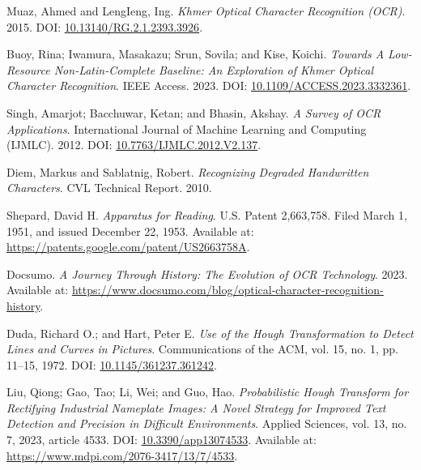 \label{ch:references}

\begin{thebibliography}{99}

Muaz, Ahmed and LengIeng, Ing. 
\textit{Khmer Optical Character Recognition (OCR)}. 
2015. 
DOI: \href{https://doi.org/10.13140/RG.2.1.2393.3926}{10.13140/RG.2.1.2393.3926}.

Buoy, Rina; Iwamura, Masakazu; Srun, Sovila; and Kise, Koichi.
\textit{Towards A Low-Resource Non-Latin-Complete Baseline: An Exploration of Khmer Optical Character Recognition}.
IEEE Access.
2023.
DOI: \href{https://doi.org/10.1109/ACCESS.2023.3332361}{10.1109/ACCESS.2023.3332361}.

Singh, Amarjot; Bacchuwar, Ketan; and Bhasin, Akshay.
\textit{A Survey of OCR Applications}.
International Journal of Machine Learning and Computing (IJMLC).
2012.
DOI: \href{https://doi.org/10.7763/IJMLC.2012.V2.137}{10.7763/IJMLC.2012.V2.137}.

Diem, Markus and Sablatnig, Robert.
\textit{Recognizing Degraded Handwritten Characters}.
CVL Technical Report.
2010.

Shepard, David H.
\textit{Apparatus for Reading}.
U.S. Patent 2,663,758. Filed March 1, 1951, and issued December 22, 1953.
Available at: \href{https://patents.google.com/patent/US2663758A}{https://patents.google.com/patent/US2663758A}.

Docsumo.
\textit{A Journey Through History: The Evolution of OCR Technology}.
2023.
Available at: \href{https://www.docsumo.com/blog/optical-character-recognition-history}{https://www.docsumo.com/blog/optical-character-recognition-history}.

Duda, Richard O.; and Hart, Peter E.
\textit{Use of the Hough Transformation to Detect Lines and Curves in Pictures}.
Communications of the ACM, vol. 15, no. 1, pp. 11–15, 1972.
DOI: \href{https://doi.org/10.1145/361237.361242}{10.1145/361237.361242}.

Liu, Qiong; Gao, Tao; Li, Wei; and Guo, Hao.
\textit{Probabilistic Hough Transform for Rectifying Industrial Nameplate Images: A Novel Strategy for Improved Text Detection and Precision in Difficult Environments}.
Applied Sciences, vol. 13, no. 7, 2023, article 4533.
DOI: \href{https://doi.org/10.3390/app13074533}{10.3390/app13074533}.
Available at: \href{https://www.mdpi.com/2076-3417/13/7/4533}{https://www.mdpi.com/2076-3417/13/7/4533}.


\end{thebibliography}
